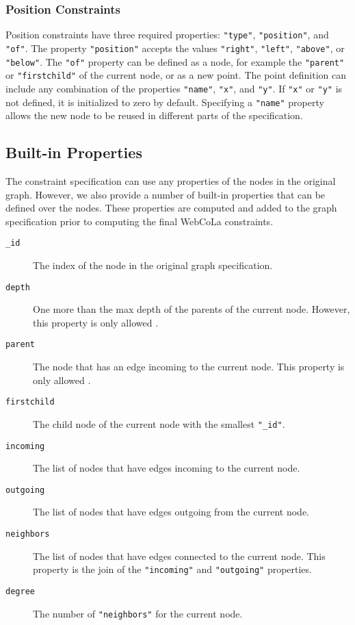 \subsubsection{Position Constraints}
Position constraints have three required properties: \texttt{"type"}, \texttt{"position"}, and \texttt{"of"}. The property \texttt{"position"} accepts the values \texttt{"right"}, \texttt{"left"}, \texttt{"above"}, or \texttt{"below"}. The \texttt{"of"} property can be defined as a node, for example the \texttt{"parent"} or \texttt{"firstchild"} of the current node, or as a new point. The point definition can include any combination of the properties \texttt{"name"}, \texttt{"x"}, and \texttt{"y"}. If \texttt{"x"} or \texttt{"y"} is not defined, it is initialized to zero by default. Specifying a \texttt{"name"} property allows the new node to be reused in different parts of the specification.  

\subsection{Built-in Properties}
The constraint specification can use any properties of the nodes in the original graph. However, we also provide a number of built-in properties that can be defined over the nodes. These properties are computed and added to the graph specification prior to computing the final WebCoLa constraints. 

\begin{description}
\item[\texttt{\_id}] The index of the node in the original graph specification.
\item[\texttt{depth}] One more than the max depth of the parents of the current node. However, this property is only allowed .
\item[\texttt{parent}] The node that has an edge incoming to the current node. This property is only allowed .
\item[\texttt{firstchild}] The child node of the current node with the smallest \texttt{"\_id"}.
\item[\texttt{incoming}] The list of nodes that have edges incoming to the current node. 
\item[\texttt{outgoing}] The list of nodes that have edges outgoing from the current node. 
\item[\texttt{neighbors}] The list of nodes that have edges connected to the current node. This property is the join of the \texttt{"incoming"} and \texttt{"outgoing"} properties.
\item[\texttt{degree}] The number of \texttt{"neighbors"} for the current node.
\end{description}

